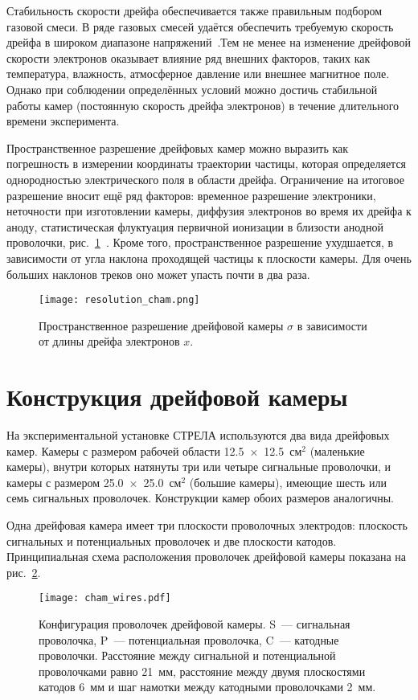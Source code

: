 Стабильность скорости дрейфа обеспечивается также правильным подбором газовой
смеси. В ряде газовых смесей удаётся обеспечить требуемую скорость дрейфа в
широком диапазоне напряжений~\cite{peisert84}.Тем не менее на изменение
дрейфовой скорости электронов оказывает влияние ряд внешних факторов, таких как
температура, влажность, атмосферное давление или внешнее магнитное поле. Однако
при соблюдении определённых условий можно достичь стабильной работы камер
(постоянную скорость дрейфа электронов) в течение длительного времени
эксперимента.

Пространственное разрешение дрейфовых камер можно выразить как погрешность в
измерении координаты траектории частицы, которая определяется однородностью
электрического поля в области дрейфа. Ограничение на итоговое разрешение вносит
ещё ряд факторов: временное разрешение электроники, неточности при изготовлении
камеры, диффузия электронов во время их дрейфа к аноду, статистическая
флуктуация первичной ионизации в близости анодной проволочки,
рис.~\ref{fig:resolution_cham}~\cite{sitar87}. Кроме того, пространственное
разрешение ухудшается, в зависимости от угла наклона проходящей частицы к
плоскости камеры. Для очень больших наклонов треков оно может упасть почти в
два раза.

\begin{figure}[h]
  \centering
  \texttt{[image: resolution\_cham.png]}
  \caption{Пространственное разрешение дрейфовой камеры $\sigma$ в зависимости
    от длины дрейфа электронов $x$.}
  \label{fig:resolution_cham}
\end{figure}

\section{Конструкция дрейфовой камеры}
На экспериментальной установке СТРЕЛА используются два вида дрейфовых камер.
Камеры с размером рабочей области 12.5~$\times$~12.5~см$^2$ (маленькие камеры),
внутри которых натянуты три или четыре сигнальные проволочки, и камеры с
размером 25.0~$\times$~25.0~см$^2$ (большие камеры), имеющие шесть или семь
сигнальных проволочек. Конструкции камер обоих размеров аналогичны.

Одна дрейфовая камера имеет три плоскости проволочных электродов: плоскость
сигнальных и потенциальных проволочек и две плоскости катодов. Принципиальная
схема расположения проволочек дрейфовой камеры показана на
рис.~\ref{fig:cham_wires}.

\begin{figure}[h]
  \centering
  \texttt{[image: cham\_wires.pdf]}
  \caption{Конфигурация проволочек дрейфовой камеры. S~--- сигнальная
    проволочка, P~--- потенциальная проволочка, C~--- катодные проволочки.
    Расстояние между сигнальной и потенциальной проволочками равно 21~мм,
    расстояние между двумя плоскостями катодов 6~мм и шаг намотки между
    катодными проволочками 2~мм.}
  \label{fig:cham_wires}
\end{figure}

